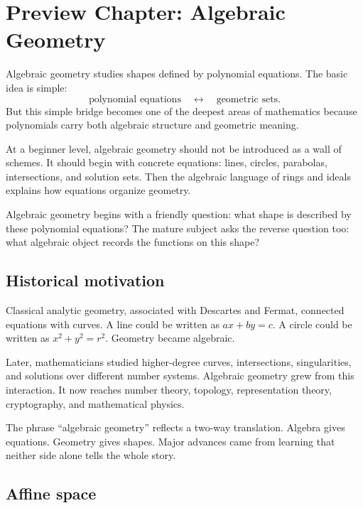 \section{Preview Chapter: Algebraic Geometry}

Algebraic geometry studies shapes defined by polynomial equations. The basic
idea is simple:
\[
\text{polynomial equations} \quad \longleftrightarrow \quad \text{geometric sets}.
\]
But this simple bridge becomes one of the deepest areas of mathematics because
polynomials carry both algebraic structure and geometric meaning.

At a beginner level, algebraic geometry should not be introduced as a wall of
schemes. It should begin with concrete equations: lines, circles, parabolas,
intersections, and solution sets. Then the algebraic language of rings and
ideals explains how equations organize geometry.

\begin{focusbox}
Algebraic geometry begins with a friendly question: what shape is described by
these polynomial equations? The mature subject asks the reverse question too:
what algebraic object records the functions on this shape?
\end{focusbox}

\subsection{Historical motivation}

Classical analytic geometry, associated with Descartes and Fermat, connected
equations with curves. A line could be written as $ax+by=c$. A circle could be
written as $x^2+y^2=r^2$. Geometry became algebraic.

Later, mathematicians studied higher-degree curves, intersections, singularities,
and solutions over different number systems. Algebraic geometry grew from this
interaction. It now reaches number theory, topology, representation theory,
cryptography, and mathematical physics.

\begin{historybox}
The phrase ``algebraic geometry'' reflects a two-way translation. Algebra gives
equations. Geometry gives shapes. Major advances came from learning that neither
side alone tells the whole story.
\end{historybox}

\subsection{Affine space}

